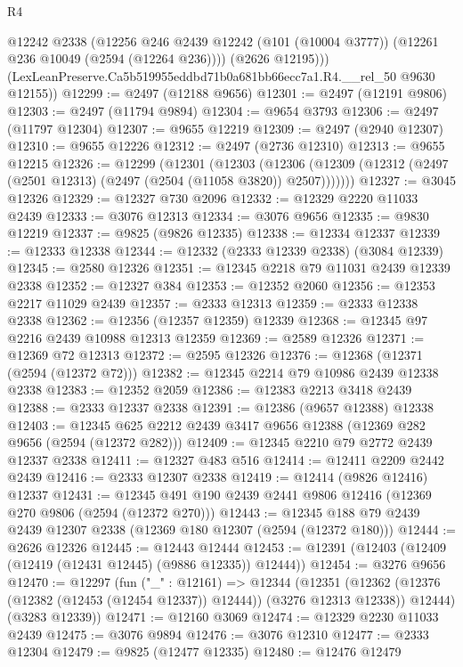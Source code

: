 \begin{lexlean}{R4}
\begin{coremodule}
          @12242
          @2338
          (@12256
            @246
            @2439
            @12242
            (@101 (@10004 @3777))
            (@12261 @236 @10049 (@2594 (@12264 @236))))
          (@2626 @12195)))
      (LexLeanPreserve.Ca5b519955eddbd71b0a681bb66ecc7a1.R4.__rel_50 @9630 @12155))
@12299 := @2497 (@12188 @9656)
@12301 := @2497 (@12191 @9806)
@12303 := @2497 (@11794 @9894)
@12304 := @9654 @3793
@12306 := @2497 (@11797 @12304)
@12307 := @9655 @12219
@12309 := @2497 (@2940 @12307)
@12310 := @9655 @12226
@12312 := @2497 (@2736 @12310)
@12313 := @9655 @12215
@12326 := @12299
    (@12301
      (@12303
        (@12306 (@12309 (@12312 (@2497 (@2501 @12313) (@2497 (@2504 (@11058 @3820)) @2507)))))))
@12327 := @3045 @12326
@12329 := @12327 @730 @2096
@12332 := @12329 @2220 @11033 @2439
@12333 := @3076 @12313
@12334 := @3076 @9656
@12335 := @9830 @12219
@12337 := @9825 (@9826 @12335)
@12338 := @12334 @12337
@12339 := @12333 @12338
@12344 := @12332 (@2333 @12339 @2338) (@3084 @12339)
@12345 := @2580 @12326
@12351 := @12345 @2218 @79 @11031 @2439 @12339 @2338
@12352 := @12327 @384
@12353 := @12352 @2060
@12356 := @12353 @2217 @11029 @2439
@12357 := @2333 @12313
@12359 := @2333 @12338 @2338
@12362 := @12356 (@12357 @12359) @12339
@12368 := @12345 @97 @2216 @2439 @10988 @12313 @12359
@12369 := @2589 @12326
@12371 := @12369 @72 @12313
@12372 := @2595 @12326
@12376 := @12368 (@12371 (@2594 (@12372 @72)))
@12382 := @12345 @2214 @79 @10986 @2439 @12338 @2338
@12383 := @12352 @2059
@12386 := @12383 @2213 @3418 @2439
@12388 := @2333 @12337 @2338
@12391 := @12386 (@9657 @12388) @12338
@12403 := @12345 @625 @2212 @2439 @3417 @9656 @12388 (@12369 @282 @9656 (@2594 (@12372 @282)))
@12409 := @12345 @2210 @79 @2772 @2439 @12337 @2338
@12411 := @12327 @483 @516
@12414 := @12411 @2209 @2442 @2439
@12416 := @2333 @12307 @2338
@12419 := @12414 (@9826 @12416) @12337
@12431 := @12345 @491 @190 @2439 @2441 @9806 @12416 (@12369 @270 @9806 (@2594 (@12372 @270)))
@12443 := @12345 @188 @79 @2439 @2439 @12307 @2338 (@12369 @180 @12307 (@2594 (@12372 @180)))
@12444 := @2626 @12326
@12445 := @12443 @12444
@12453 := @12391 (@12403 (@12409 (@12419 (@12431 @12445) (@9886 @12335)) @12444))
@12454 := @3276 @9656
@12470 := @12297
    (fun ("_" : @12161) =>
    @12344
      (@12351
        (@12362 (@12376 (@12382 (@12453 (@12454 @12337)) @12444)) (@3276 @12313 @12338))
        @12444)
      (@3283 @12339))
@12471 := @12160 @3069
@12474 := @12329 @2230 @11033 @2439
@12475 := @3076 @9894
@12476 := @3076 @12310
@12477 := @2333 @12304
@12479 := @9825 (@12477 @12335)
@12480 := @12476 @12479

\end{coremodule}
\end{lexlean}
